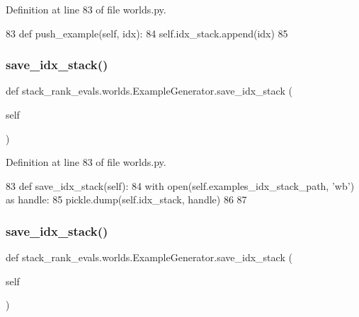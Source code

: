 Definition at line 83 of file worlds.\+py.


\begin{DoxyCode}
83     \textcolor{keyword}{def }push\_example(self, idx):
84         self.idx\_stack.append(idx)
85 
\end{DoxyCode}
\mbox{\label{classstack__rank__evals_1_1worlds_1_1ExampleGenerator_a47a988958641b4906b2d374938974cca}} 
\subsubsection{\texorpdfstring{save\+\_\+idx\+\_\+stack()}{save\_idx\_stack()}\hspace{0.1cm}{\footnotesize\ttfamily [1/2]}}
{\footnotesize\ttfamily def stack\+\_\+rank\+\_\+evals.\+worlds.\+Example\+Generator.\+save\+\_\+idx\+\_\+stack (\begin{DoxyParamCaption}\item[{}]{self }\end{DoxyParamCaption})}



Definition at line 83 of file worlds.\+py.


\begin{DoxyCode}
83     \textcolor{keyword}{def }save\_idx\_stack(self):
84         with open(self.examples\_idx\_stack\_path, \textcolor{stringliteral}{'wb'}) \textcolor{keyword}{as} handle:
85             pickle.dump(self.idx\_stack, handle)
86 
87 
\end{DoxyCode}
\mbox{\label{classstack__rank__evals_1_1worlds_1_1ExampleGenerator_a47a988958641b4906b2d374938974cca}} 
\subsubsection{\texorpdfstring{save\+\_\+idx\+\_\+stack()}{save\_idx\_stack()}\hspace{0.1cm}{\footnotesize\ttfamily [2/2]}}
{\footnotesize\ttfamily def stack\+\_\+rank\+\_\+evals.\+worlds.\+Example\+Generator.\+save\+\_\+idx\+\_\+stack (\begin{DoxyParamCaption}\item[{}]{self }\end{DoxyParamCaption})}



